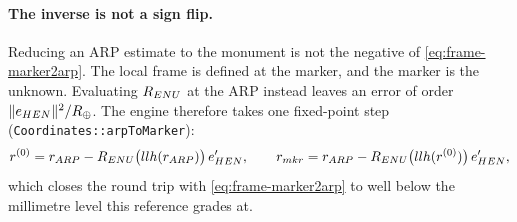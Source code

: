 \documentclass[main.tex]{subfiles}
\begin{document}
\paragraph{The inverse is not a sign flip.}
Reducing an ARP estimate to the monument is not the negative of
\eqref{eq:frame-marker2arp}.  The local frame is defined at the marker,
and the marker is the unknown.  Evaluating $R_{ENU}$ at the ARP instead
leaves an error of order $\lVert e_{HEN}\rVert^{2}/R_{\oplus}$.
The engine therefore takes one fixed-point step
(\texttt{Coordinates::arpToMarker}):
\begin{equation}
r^{(0)} = r_{ARP}
  - R_{ENU}\big(llh(r_{ARP})\big)\,e_{HEN}',
\qquad
r_{mkr} = r_{ARP}
  - R_{ENU}\big(llh(r^{(0)})\big)\,e_{HEN}',
\label{eq:frame-arp2marker}
\end{equation}
which closes the round trip with \eqref{eq:frame-marker2arp} to well
below the millimetre level this reference grades at.
\end{document}

